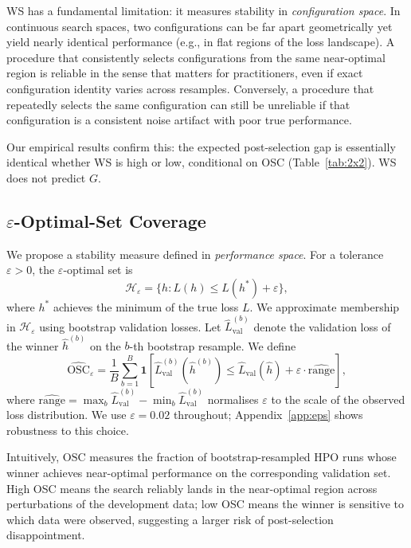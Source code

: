 \documentclass[twoside]{article}
\newcommand{\OSC}{\mathrm{OSC}}
\newcommand{\Heps}{\mathcal{H}_\varepsilon}
\newcommand{\hhat}{\hat{h}}
\newcommand{\hstar}{h^*}
\newcommand{\Lval}{\hat{L}_{\mathrm{val}}}
\begin{document}
WS has a fundamental limitation: it measures stability in
\emph{configuration space}. In continuous search spaces, two
configurations can be far apart geometrically yet yield nearly identical
performance (e.g., in flat regions of the loss landscape). A procedure
that consistently selects configurations from the same near-optimal
region is reliable in the sense that matters for practitioners, even if
exact configuration identity varies across resamples. Conversely, a
procedure that repeatedly selects the same configuration can still be
unreliable if that configuration is a consistent noise artifact with
poor true performance.

Our empirical results confirm this: the expected post-selection gap is
essentially identical whether WS is high or low, conditional on OSC
(Table~\ref{tab:2x2}). WS does not predict $G$.

\subsection{$\varepsilon$-Optimal-Set Coverage}
\label{sec:osc}

We propose a stability measure defined in \emph{performance space}.
For a tolerance $\varepsilon > 0$, the $\varepsilon$-optimal set is
\begin{equation}
  \Heps = \bigl\{h : L(h) \le L(\hstar) + \varepsilon\bigr\},
\end{equation}
where $\hstar$ achieves the minimum of the true loss $L$. We approximate
membership in $\Heps$ using bootstrap validation losses. Let
$\hat{L}^{(b)}_\mathrm{val}$ denote the validation loss of the winner
$\hhat^{(b)}$ on the $b$-th bootstrap resample. We define
\begin{equation}
  \widehat{\OSC}_\varepsilon =
    \frac{1}{B}\sum_{b=1}^{B}
    \mathbf{1}\!\left[
      \hat{L}^{(b)}_\mathrm{val}(\hhat^{(b)}) \le
      \Lval(\hhat) + \varepsilon \cdot \widehat{\mathrm{range}}
    \right],
\label{eq:osc}
\end{equation}
where $\widehat{\mathrm{range}} = \max_b \hat{L}^{(b)}_\mathrm{val}
- \min_b \hat{L}^{(b)}_\mathrm{val}$ normalises $\varepsilon$ to the
scale of the observed loss distribution. We use $\varepsilon = 0.02$
throughout; Appendix~\ref{app:eps} shows robustness to this choice.

Intuitively, $\OSC$ measures the fraction of bootstrap-resampled HPO
runs whose winner achieves near-optimal performance on the corresponding
validation set. High OSC means the search reliably lands in the
near-optimal region across perturbations of the development data; low
OSC means the winner is sensitive to which data were observed, suggesting
a larger risk of post-selection disappointment.
\end{document}
